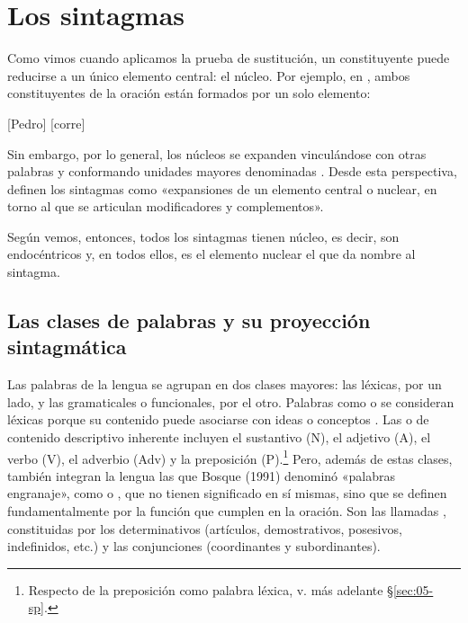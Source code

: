 \section{Los sintagmas}\label{sec:05-sintagmas}

Como vimos cuando aplicamos la prueba de sustitución, un constituyente puede
reducirse a un único elemento central: el núcleo. Por ejemplo, en
, ambos constituyentes de la oración están formados por un
solo elemento:

\begin{exe}
  \ex\label{ex:05-pedro} {}[Pedro] [corre]
\end{exe}

Sin embargo, por lo general, los núcleos se expanden vinculándose con otras
palabras y conformando unidades mayores denominadas . Desde
esta perspectiva, \textcite[138]{bosque2009} definen los sintagmas como
«expansiones de un elemento central o nuclear, en torno al que se articulan
modificadores y complementos».

\begin{destacado}
Según vemos, entonces, todos los sintagmas tienen núcleo, es decir, son
endocéntricos y, en todos ellos, es el elemento nuclear el que da nombre al
sintagma.
\end{destacado}

\subsection{Las clases de palabras y su proyección sintagmática}\label{sec:05-clases}

Las palabras de la lengua se agrupan en dos clases mayores: las léxicas, por un
lado, y las gramaticales o funcionales, por el otro. Palabras como  o  se consideran léxicas porque su contenido
puede asociarse con ideas o conceptos \parencite[52]{rodriguezramalle2005}. Las
 o de contenido descriptivo inherente incluyen el
sustantivo (N), el adjetivo (A), el verbo (V), el adverbio (Adv) y la
preposición (P).\footnote{Respecto de la preposición como palabra léxica, v. más
adelante §\ref{sec:05-sp}.} Pero, además de estas clases, también integran la
lengua las que Bosque (1991)
denominó «palabras engranaje», como  o , que no
tienen significado en sí mismas, sino que se definen fundamentalmente por la
función que cumplen en la oración. Son las llamadas , constituidas por los determinativos (artículos, demostrativos,
posesivos, indefinidos, etc.) y las conjunciones (coordinantes y
subordinantes).

